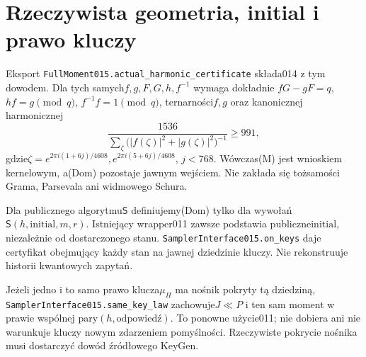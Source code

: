 \documentclass[11pt,a4paper]{article}
\newcommand{\code}[1]{\nolinkurl{#1}}
\begin{document}
\section{Rzeczywista geometria, initial i prawo kluczy}
Eksport \code{FullMoment015.actual_harmonic_certificate} składa014 z tym
dowodem. Dla tych samych$f,g,F,G,h,f^{-1}$ wymaga dokładnie
$fG-gF=q$, $hf=g\pmod q$, $f^{-1}f=1\pmod q$, ternarności$f,g$
oraz kanonicznej harmonicznej
\[
 \frac{1536}{\sum_{\zeta}\bigl(|f(\zeta)|^2+|g(\zeta)|^2\bigr)^{-1}}\ge991,
\]
gdzie$\zeta=e^{2\pi i(1+6j)/4608},e^{2\pi i(5+6j)/4608}$, $j<768$.
Wówczas(M) jest wnioskiem kernelowym, a(Dom) pozostaje jawnym wejściem.
Nie zakłada się tożsamości Grama, Parsevala ani widmowego Schura.

Dla publicznego algorytmu$\mathsf S$ definiujemy(Dom) tylko dla wywołań
$\mathsf S(h,\mathrm{initial},m,r)$. Istniejący wrapper011 zawsze podstawia
publiczne$\mathrm{initial}$, niezależnie od dostarczonego stanu.
\code{SamplerInterface015.on_keys} daje certyfikat obejmujący każdy stan
na jawnej dziedzinie kluczy. Nie rekonstruuje historii kwantowych zapytań.

Jeżeli jedno i to samo prawo klucza$\mu_H$ ma nośnik pokryty tą dziedziną,
\code{SamplerInterface015.same_key_law} zachowuje$J\ll P$ i ten sam moment
w prawie wspólnej pary$(h,\text{odpowiedź})$. To ponowne użycie011;
nie dobiera ani nie warunkuje kluczy nowym zdarzeniem pomyślności.
Rzeczywiste pokrycie nośnika musi dostarczyć dowód źródłowego KeyGen.
\end{document}
